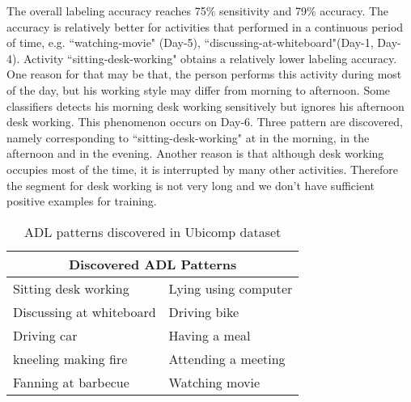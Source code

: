 \documentclass{sigchi}
\begin{document}
     The overall labeling accuracy reaches 75\% sensitivity and 79\% accuracy.
     The accuracy is relatively better for activities that performed in a continuous period of time, e.g. ``watching-movie" (Day-5), ``discussing-at-whiteboard"(Day-1, Day-4).
     Activity ``sitting-desk-working" obtains a relatively lower labeling accuracy.
     One reason for that may be that, the person performs this activity during most of the day, but his working style may differ from morning to afternoon.
     Some classifiers detects his morning desk working sensitively but ignores his afternoon desk working.
     This phenomenon occurs on Day-6. Three pattern are discovered, namely corresponding to ``sitting-desk-working" at in the morning, in the afternoon and in the evening.
     Another reason is that although desk working occupies most of the time, it is interrupted by many other activities.
     Therefore the segment for desk working is not very long and we don't have sufficient positive examples for training.

\begin{table}[htbp]
    \begin{tabular}{rr}
    \toprule
    \multicolumn{2}{c}{\textbf{Discovered ADL Patterns}} \\
    \midrule
    \multicolumn{1}{l}{Sitting desk working} & \multicolumn{1}{l}{Lying using computer} \\
    \multicolumn{1}{l}{Discussing at whiteboard} & \multicolumn{1}{l}{Driving bike} \\
    \multicolumn{1}{l}{Driving car} & \multicolumn{1}{l}{Having a meal} \\
    \multicolumn{1}{l}{kneeling making fire} & \multicolumn{1}{l}{Attending a meeting} \\
    \multicolumn{1}{l}{Fanning at barbecue} & \multicolumn{1}{l}{Watching movie} \\
    \bottomrule
    \end{tabular}%
    \caption{ADL patterns discovered in Ubicomp dataset}
  \label{tab: ADL patterns discovered}%
\end{table}%
\end{document}
